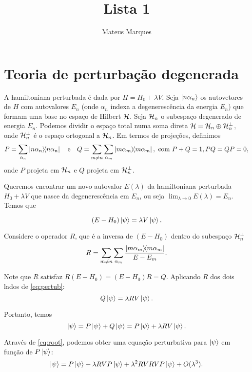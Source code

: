 \documentclass[a4paper,10pt]{article}
\title{\Huge{\textbf{Lista 1}}}
\author{Mateus Marques}
\begin{document}
\maketitle


\section{Teoria de perturbação degenerada}

A hamiltoniana perturbada é dada por $H = H_0 + \lambda V$. Seja $\ket{n \alpha_n}$ os autovetores de $H$ com autovalores $E_n$ (onde $\alpha_n$ indexa a degenerescência da energia $E_n$) que formam uma base no espaço de Hilbert $\mathcal{H}$. Seja $\mathcal{H}_n$ o subespaço degenerado de energia $E_n$. Podemos dividir o espaço total numa soma direta $\mathcal{H} = \mathcal{H}_n \oplus \mathcal{H}_n^\perp$, onde $\mathcal{H}_n^\perp$ é o espaço ortogonal a $\mathcal{H}_n$. Em termos de projeções, definimos
$$
P = \sum_{\alpha_n} \ketbra{n \alpha_n} \quad \mathrm{e} \quad
Q = \sum_{m \neq n} \sum_{\alpha_m} \ketbra{m \alpha_m}, \text{ com }
P + Q = 1, PQ = QP = 0,
$$
onde $P$ projeta em $\mathcal{H}_n$ e $Q$ projeta em $\mathcal{H}_n^\perp$.

Queremos encontrar um novo autovalor $E(\lambda)$ da hamiltoniana perturbada $H_0 + \lambda V$ que nasce da degenerescência em $E_n$, ou seja $\displaystyle{\lim_{\lambda \to 0} E(\lambda) = E_n}$. Temos que

\begin{equation} \label{eq:pertub}
(E - H_0) \ket{\psi} = \lambda V \ket{\psi}.
\end{equation}

Considere o operador $R$, que é a inversa de $(E - H_0)$ dentro do subespaço $\mathcal{H}_n^\perp$
$$
R = \sum_{m \neq n} \sum_{\alpha_m} \frac{\ketbra{m \alpha_m}}{E - E_m}.
$$

Note que $R$ satisfaz $R (E - H_0) = (E - H_0) R = Q$. Aplicando $R$ dos dois lados de \ref{eq:pertub}:
$$
Q \ket{\psi} = \lambda R V \ket{\psi}.
$$

Portanto, temos
\begin{equation} \label{eq:root}
\ket{\psi} = P \ket{\psi} + Q \ket{\psi} =
P \ket{\psi} + \lambda R V \ket{\psi}.
\end{equation}

Através de \ref{eq:root}, podemos obter uma equação perturbativa para $\ket{\psi}$ em função de $P \ket{\psi}$:
\begin{equation} \label{eq:recorr}
\ket{\psi} = P \ket{\psi} + \lambda R V P \ket{\psi} + \lambda^2 R V R V P \ket{\psi} + O(\lambda^3).
\end{equation}
\end{document}

